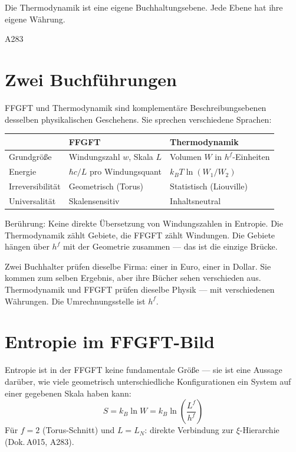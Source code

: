 \label{ch:thermodynamik}

\epigraph{Die Thermodynamik ist eine eigene Buchhaltungsebene.
Jede Ebene hat ihre eigene Währung.}{A283}

\section{Zwei Buchführungen}

FFGFT und Thermodynamik sind komplementäre Beschreibungsebenen desselben
physikalischen Geschehens. Sie sprechen verschiedene Sprachen: 

\begin{center}
\begingroup\small
\begin{tabular}{@{}p{2.2cm}p{3.8cm}p{3.8cm}@{}}
\toprule
& \textbf{FFGFT} & \textbf{Thermodynamik} \\
\midrule
Grundgröße
  & Windungszahl $w$, Skala $L$
  & Volumen $W$ in $h^f$-Einheiten \\[3pt]
Energie
  & $\hbar c / L$ pro Windungsquant
  & $k_BT\ln(W_1/W_2)$ \\[3pt]
Irre\-ver\-si\-bi\-li\-tät
  & Geometrisch (Torus)
  & Statistisch (Liouville) \\[3pt]
Univer\-salität
  & Skalensensitiv
  & Inhaltsneutral \\
\bottomrule
\end{tabular}
\endgroup
\end{center}

Berührung: Keine direkte Übersetzung von Windungszahlen in Entropie.
Die Thermodynamik zählt Gebiete, die FFGFT zählt Windungen. Die Gebiete
hängen über $h^f$ mit der Geometrie zusammen --- das ist die einzige Brücke.

\begin{laierspur}
Zwei Buchhalter prüfen dieselbe Firma: einer in Euro, einer in Dollar.
Sie kommen zum selben Ergebnis, aber ihre Bücher sehen verschieden aus.
Thermodynamik und FFGFT prüfen dieselbe Physik --- mit verschiedenen
Währungen. Die Umrechnungsstelle ist $h^f$.
\end{laierspur}

\section{Entropie im FFGFT-Bild}

Entropie ist in der FFGFT keine fundamentale Größe --- sie ist eine
Aussage darüber, wie viele geometrisch unterschiedliche Konfigurationen
ein System auf einer gegebenen Skala haben kann:
\[
  S = k_B \ln W = k_B \ln\!\left(\frac{L^f}{h^f}\right)
\]
Für $f = 2$ (Torus-Schnitt) und $L = L_N$: direkte Verbindung zur
$\xi$-Hierarchie (Dok.\,A015, A283). 


